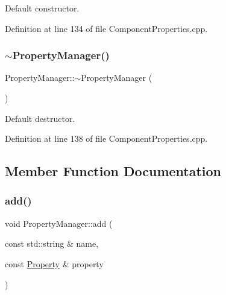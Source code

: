 Default constructor. 



Definition at line 134 of file Component\+Properties.\+cpp.

\hypertarget{class_d_d4hep_1_1_property_manager_aa16d7f0cb2a2baaa3b3afbe6239aac39}{}\label{class_d_d4hep_1_1_property_manager_aa16d7f0cb2a2baaa3b3afbe6239aac39} 
\subsubsection{\texorpdfstring{$\sim$\+Property\+Manager()}{~PropertyManager()}}
{\footnotesize\ttfamily Property\+Manager\+::$\sim$\+Property\+Manager (\begin{DoxyParamCaption}{ }\end{DoxyParamCaption})\hspace{0.3cm}{\ttfamily [virtual]}}



Default destructor. 



Definition at line 138 of file Component\+Properties.\+cpp.



\subsection{Member Function Documentation}
\hypertarget{class_d_d4hep_1_1_property_manager_a22dd94fc144031932799c3e4fe431503}{}\label{class_d_d4hep_1_1_property_manager_a22dd94fc144031932799c3e4fe431503} 
\subsubsection{\texorpdfstring{add()}{add()}\hspace{0.1cm}{\footnotesize\ttfamily [1/2]}}
{\footnotesize\ttfamily void Property\+Manager\+::add (\begin{DoxyParamCaption}\item[{const std\+::string \&}]{name,  }\item[{const \hyperlink{class_d_d4hep_1_1_property}{Property} \&}]{property }\end{DoxyParamCaption})}




